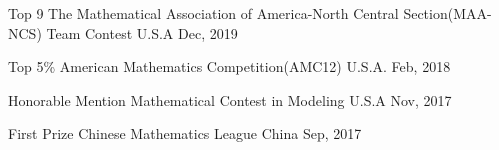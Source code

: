 



\begin{cvhonors}

  \cvhonor
    {Top 9} %
    {The Mathematical Association of America-North Central Section(MAA-NCS) Team Contest} %
    {U.S.A} %
    {Dec, 2019} %

  \cvhonor
    {Top 5\%} %
    {American Mathematics Competition(AMC12)} %
    {U.S.A.} %
    {Feb, 2018} %

  \cvhonor
    {Honorable Mention} %
    {Mathematical Contest in Modeling} %
    {U.S.A} %
    {Nov, 2017} %

  \cvhonor
    {First Prize} %
    {Chinese Mathematics League} %
    {China} %
    {Sep, 2017} %

\end{cvhonors}


